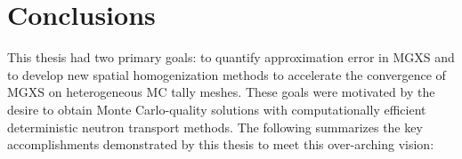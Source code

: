 \documentclass[12pt,twoside]{mitthesis-exec}
\begin{document}
\clearpage

\section*{Conclusions}

This thesis had two primary goals: to quantify approximation error in MGXS and to develop new spatial homogenization methods to accelerate the convergence of MGXS on heterogeneous MC tally meshes. These goals were motivated by the desire to obtain Monte Carlo-quality solutions with computationally efficient deterministic neutron transport methods. The following summarizes the key accomplishments demonstrated by this thesis to meet this over-arching vision:


\end{document}
